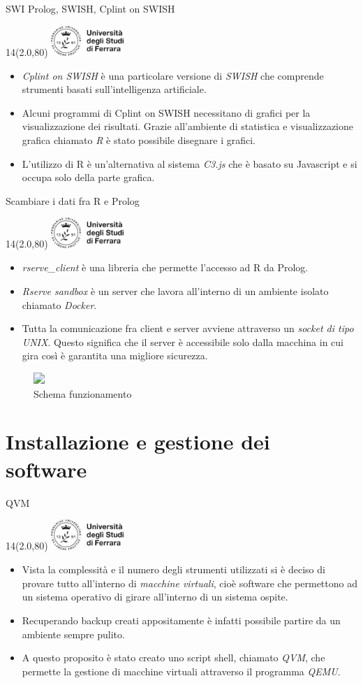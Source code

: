 \documentclass[11pt,xcolor={dvipsnames},default]{beamer} %
\newcommand{\MyLogo}{%
\begin{textblock}{14}(2.0,80)
 \includegraphics[height=1.15cm, angle=0]{logo}
\end{textblock}
}
\begin{document}
\begin{frame}{SWI Prolog, SWISH, Cplint on SWISH}
\transboxin
\MyLogo
\begin{itemize}
\item \emph{Cplint on SWISH} è una particolare versione di \emph{SWISH} che 
comprende strumenti basati sull'intelligenza artificiale.
\item Alcuni programmi di Cplint on SWISH necessitano di grafici per la 
visualizzazione dei risultati. Grazie all'ambiente di statistica e 
visualizzazione grafica chiamato \emph{R} è stato possibile disegnare i 
grafici.
\item L'utilizzo di R è un'alternativa al sistema \emph{C3.js} che è basato su 
Javascript e si occupa solo della parte grafica.
\end{itemize}
\end{frame}

\begin{frame}{Scambiare i dati fra R e Prolog}
\transboxin
\MyLogo
\begin{itemize}
\item \emph{rserve\_client} è una libreria che permette l'accesso ad R da Prolog.
\item \emph{Rserve sandbox} è un server che lavora all'interno di un ambiente 
isolato chiamato \emph{Docker}.
\item Tutta la comunicazione fra client e server avviene attraverso un 
\emph{socket di tipo UNIX}. Questo significa che il server è accessibile solo
dalla macchina in cui gira così è garantita una migliore sicurezza.
\end{itemize}
\centering
\begin{figure}
\includegraphics<1>[width=.3\textwidth]{rserve_sandbox_scheme.png}
\caption{Schema funzionamento}
\end{figure}
\end{frame}

\section{Installazione e gestione dei software}
\begin{frame}{QVM}
\transboxin
\MyLogo
\begin{itemize}
\item Vista la complessità e il numero degli strumenti utilizzati si è deciso 
di provare tutto all'interno di \emph{macchine virtuali}, cioè software che 
permettono ad un sistema operativo di girare all'interno di un sistema ospite.
\item Recuperando backup creati appositamente è infatti possibile partire da 
un ambiente sempre pulito.
\item A questo proposito è stato creato uno script shell, chiamato \emph{QVM}, 
che permette la gestione di macchine virtuali attraverso il programma 
\emph{QEMU}.
\end{itemize}
\end{frame}
\end{document}
